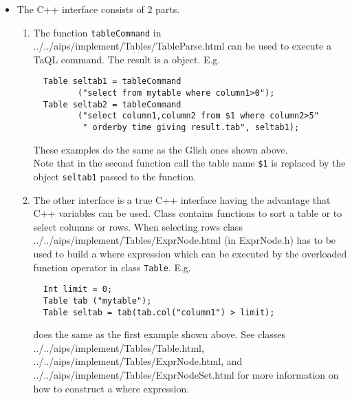 \begin{itemize}
\item
  The C++ interface consists of 2 parts.
  \begin{enumerate}
  \item
    The function \texttt{tableCommand} in
    {../../aips/implement/Tables/TableParse.html}
    can be used to execute a TaQL command. The result is a
    object. E.g.
\begin{verbatim}
  Table seltab1 = tableCommand
         ("select from mytable where column1>0");
  Table seltab2 = tableCommand
         ("select column1,column2 from $1 where column2>5"
          " orderby time giving result.tab", seltab1);
\end{verbatim}
    These examples do the same as the Glish ones shown above.
    \\Note that in the second function call the table name
    \texttt{\$1} is replaced by the object \texttt{seltab1}
    passed to the function.

  \item
    The other interface is a true C++ interface having the
    advantage that C++ variables can be used. Class
    contains functions to sort a table or to select columns or rows.
    When selecting rows class 
    {../../aips/implement/Tables/ExprNode.html} (in ExprNode.h)
    has to be used to
    build a where expression which can be executed by the overloaded
    function operator in class \texttt{Table}. E.g.
\begin{verbatim}
  Int limit = 0;
  Table tab ("mytable");
  Table seltab = tab(tab.col("column1") > limit);
\end{verbatim}
    does the same as the first example shown above.
    See classes 
    {../../aips/implement/Tables/Table.html},
    {../../aips/implement/Tables/ExprNode.html}, and
    {../../aips/implement/Tables/ExprNodeSet.html} for more
    information on how to construct a where expression.
  \end{enumerate}
  
\end{itemize}

